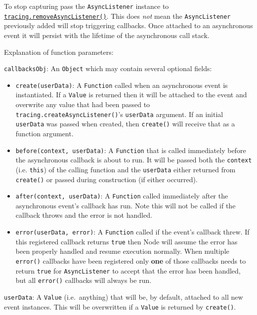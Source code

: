 To stop capturing pass the \texttt{AsyncListener} instance to
\hyperref[tracingux5ftracingux5fremoveasynclistenerux5fasynclistener]{\texttt{tracing.removeAsyncListener()}}.
This does \emph{not} mean the \texttt{AsyncListener} previously added
will stop triggering callbacks. Once attached to an asynchronous event
it will persist with the lifetime of the asynchronous call stack.

Explanation of function parameters:

\texttt{callbacksObj}: An \texttt{Object} which may contain several
optional fields:

\begin{itemize}
\item
  \texttt{create(userData)}: A \texttt{Function} called when an
  asynchronous event is instantiated. If a \texttt{Value} is returned
  then it will be attached to the event and overwrite any value that had
  been passed to \texttt{tracing.createAsyncListener()}'s
  \texttt{userData} argument. If an initial \texttt{userData} was passed
  when created, then \texttt{create()} will receive that as a function
  argument.
\item
  \texttt{before(context, userData)}: A \texttt{Function} that is called
  immediately before the asynchronous callback is about to run. It will
  be passed both the \texttt{context} (i.e. \texttt{this}) of the
  calling function and the \texttt{userData} either returned from
  \texttt{create()} or passed during construction (if either occurred).
\item
  \texttt{after(context, userData)}: A \texttt{Function} called
  immediately after the asynchronous event's callback has run. Note this
  will not be called if the callback throws and the error is not
  handled.
\item
  \texttt{error(userData, error)}: A \texttt{Function} called if the
  event's callback threw. If this registered callback returns
  \texttt{true} then Node will assume the error has been properly
  handled and resume execution normally. When multiple \texttt{error()}
  callbacks have been registered only \textbf{one} of those callbacks
  needs to return \texttt{true} for \texttt{AsyncListener} to accept
  that the error has been handled, but all \texttt{error()} callbacks
  will always be run.
\end{itemize}

\texttt{userData}: A \texttt{Value} (i.e.~anything) that will be, by
default, attached to all new event instances. This will be overwritten
if a \texttt{Value} is returned by \texttt{create()}.

